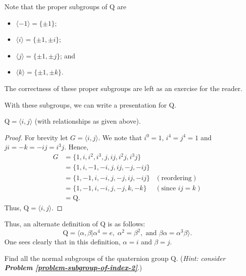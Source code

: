 \newpage

Note that the proper subgroups of $\mathrm{Q}$ are
\begin{multicols}{2}
    \begin{itemize}
        \item $\langle -1 \rangle = \{\pm1\}$;
        \item $\langle i \rangle = \{\pm1, \pm i\}$;
        \item $\langle j \rangle = \{\pm1, \pm j\}$; and
        \item $\langle k \rangle = \{\pm1, \pm k\}$.
    \end{itemize}
\end{multicols}
The correctness of these proper subgroups are left as an exercise for the reader.

With these subgroups, we can write a presentation for $\mathrm{Q}$.

\begin{proposition}
    $\mathrm{Q} = \langle i, j \rangle$ (with relationships as given above).
\end{proposition}
\begin{proof}
    For brevity let $G = \langle i, j \rangle$. We note that $i^0 = 1$, $i^4 = j^4 = 1$ and $ji = -k = -ij = i^3j$. Hence,
    \begin{align*}
        G &= \{1, i, i^2, i^3, j, ij, i^2j, i^3j\}\\
        &= \{1, i, -1, -i, j, ij, -j, -ij\}\\
        &= \{1, -1, i, -i, j, -j, ij, -ij\} & (\text{reordering})\\
        &= \{1, -1, i, -i, j, -j, k, -k\} & (\text{since } ij = k)\\
        &= \mathrm{Q}.
    \end{align*}
    Thus, $\mathrm{Q} = \langle i, j \rangle$.
\end{proof}

Thus, an alternate definition of $\mathrm{Q}$ is as follows:
\[
    \mathrm{Q} = \langle \alpha, \beta \vert \alpha^4 = e,\; \alpha^2 = \beta^2, \text{ and } \beta\alpha = \alpha^3\beta \rangle.
\]
One sees clearly that in this definition, $\alpha = i$ and $\beta = j$.

\begin{exercise}\label{exercise-normal-subgroups-of-quarternion-group}
    Find all the normal subgroups of the quaternion group $\mathrm{Q}$.\newline
    (\textit{Hint: consider \textbf{Problem \ref{problem-subgroup-of-index-2}}}.)
\end{exercise}

